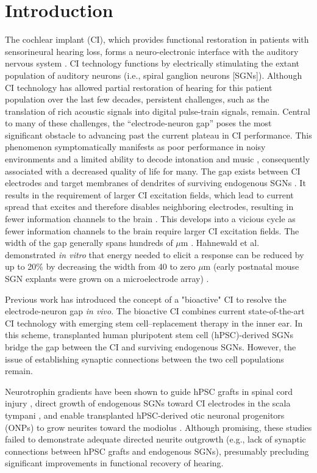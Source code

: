 \documentclass[review]{elsarticle}
\begin{document}
\section{Introduction}
\indent The cochlear implant (CI), which provides functional restoration in patients with sensorineural hearing loss, forms a neuro-electronic interface with the auditory nervous system \cite{Naples2020a}. CI technology functions by electrically stimulating the extant population of auditory neurons (i.e., spiral ganglion neurons [SGNs]). Although CI technology has allowed partial restoration of hearing for this patient population over the last few decades, persistent challenges, such as the translation of rich acoustic signals into digital pulse-train signals, remain. Central to many of these challenges, the “electrode-neuron gap” poses the most significant obstacle to advancing past the current plateau in CI performance. This phenomenon symptomatically manifests as poor performance in noisy environments and a limited ability to decode intonation and music \cite{Wilson2008a}, consequently associated with a decreased quality of life for many. The gap exists between CI electrodes and target membranes of dendrites of surviving endogenous SGNs \cite{Frick2017}. It results in the requirement of larger CI excitation fields, which lead to current spread that excites and therefore disables neighboring electrodes, resulting in fewer information channels to the brain \cite{Wilson2008a, Hahnewald2016}. This develops into a vicious cycle as fewer information channels to the brain require larger CI excitation fields. The width of the gap generally spans hundreds of $\mu$m \cite{Shepherd1993, Tykocinski2000}. Hahnewald et al. demonstrated \textit{in vitro} that energy needed to elicit a response can be reduced by up to 20\% by decreasing the width from 40 to zero $\mu$m (early postnatal mouse SGN explants were grown on a microelectrode array) \cite{Hahnewald2016}.

\indent Previous work has introduced the concept of a "bioactive" CI to resolve the electrode-neuron gap \textit{in vivo}\cite{Roemer2016a, Heuer2021, Chang2020}. The bioactive CI combines current state-of-the-art CI technology with emerging stem cell–replacement therapy in the inner ear. In this scheme, transplanted human pluripotent stem cell (hPSC)-derived SGNs bridge the gap between the CI and surviving endogenous SGNs. However, the issue of establishing synaptic connections between the two cell populations remain.

 \indent Neurotrophin gradients have been shown to guide hPSC grafts in spinal cord injury \cite{Taylor2006}, direct growth of endogenous SGNs toward CI electrodes in the scala tympani \cite{Senn2017}, and enable transplanted hPSC-derived otic neuronal progenitors (ONPs) to grow neurites toward the modiolus \cite{Chang2020}. Although promising, these studies failed to demonstrate adequate directed neurite outgrowth (e.g., lack of synaptic connections between hPSC grafts and endogenous SGNs), presumably precluding significant improvements in functional recovery of hearing.
\end{document}
